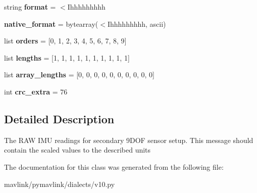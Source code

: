 \begin{DoxyCompactItemize}
\mbox{\label{classpymavlink_1_1dialects_1_1v10_1_1MAVLink__scaled__imu2__message_aeaf3c349b75ae23f69d941f6142e6579}} 
string {\bfseries format} = \textquotesingle{}$<$Ihhhhhhhhh\textquotesingle{}
\item 
\mbox{\label{classpymavlink_1_1dialects_1_1v10_1_1MAVLink__scaled__imu2__message_a11f9a11fadcaa49f2070836f82ca468d}} 
{\bfseries native\+\_\+format} = bytearray(\textquotesingle{}$<$Ihhhhhhhhh\textquotesingle{}, \textquotesingle{}ascii\textquotesingle{})
\item 
\mbox{\label{classpymavlink_1_1dialects_1_1v10_1_1MAVLink__scaled__imu2__message_adf65a5280cc0267db1e851ae2e6ca92c}} 
list {\bfseries orders} = \mbox{[}0, 1, 2, 3, 4, 5, 6, 7, 8, 9\mbox{]}
\item 
\mbox{\label{classpymavlink_1_1dialects_1_1v10_1_1MAVLink__scaled__imu2__message_ac20663fe94776808aaaa9182cd6832ff}} 
list {\bfseries lengths} = \mbox{[}1, 1, 1, 1, 1, 1, 1, 1, 1, 1\mbox{]}
\item 
\mbox{\label{classpymavlink_1_1dialects_1_1v10_1_1MAVLink__scaled__imu2__message_a78343a711e2acc652b4c129b92421404}} 
list {\bfseries array\+\_\+lengths} = \mbox{[}0, 0, 0, 0, 0, 0, 0, 0, 0, 0\mbox{]}
\item 
\mbox{\label{classpymavlink_1_1dialects_1_1v10_1_1MAVLink__scaled__imu2__message_a7ea52c1f61b269ee002c7f814d3ecfdc}} 
int {\bfseries crc\+\_\+extra} = 76
\end{DoxyCompactItemize}


\subsection{Detailed Description}
\begin{DoxyVerb}The RAW IMU readings for secondary 9DOF sensor setup. This
message should contain the scaled values to the described
units
\end{DoxyVerb}
 

The documentation for this class was generated from the following file\+:\begin{DoxyCompactItemize}
\item 
mavlink/pymavlink/dialects/v10.\+py\end{DoxyCompactItemize}
